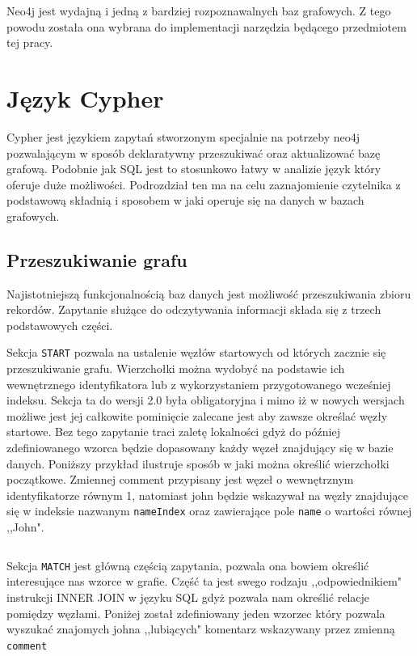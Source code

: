 \documentclass[brudnopis]{xmgr}
\begin{document}
Neo4j jest wydajną i jedną z bardziej rozpoznawalnych baz grafowych. Z tego powodu została ona wybrana do implementacji narzędzia będącego przedmiotem tej pracy.

\section{Język Cypher}
Cypher jest językiem zapytań stworzonym specjalnie na potrzeby neo4j pozwalającym w sposób deklaratywny przeszukiwać oraz aktualizować bazę grafową. Podobnie jak SQL jest to stosunkowo łatwy w analizie język który oferuje duże możliwości. Podrozdział ten ma na celu zaznajomienie czytelnika z podstawową składnią i sposobem w jaki operuje się na danych w bazach grafowych.

\subsection{Przeszukiwanie grafu}

Najistotniejszą funkcjonalnością baz danych jest możliwość przeszukiwania zbioru rekordów. Zapytanie służące do odczytywania informacji składa się z trzech podstawowych części.

Sekcja \texttt{START} pozwala na ustalenie węzłów startowych od których zacznie się przeszukiwanie grafu. Wierzchołki można wydobyć na podstawie ich wewnętrznego identyfikatora lub z wykorzystaniem przygotowanego wcześniej indeksu. Sekcja ta do wersji 2.0 była obligatoryjna i mimo iż w nowych wersjach możliwe jest jej całkowite pominięcie zalecane jest aby zawsze określać węzły startowe. Bez tego zapytanie traci zaletę lokalności gdyż do później zdefiniowanego wzorca będzie dopasowany każdy węzeł znajdujący się w bazie danych. Poniższy przykład ilustruje sposób w jaki można określić wierzchołki początkowe. Zmiennej comment przypisany jest węzeł o wewnętrznym identyfikatorze równym 1, natomiast john będzie wskazywał na węzły znajdujące się w indeksie nazwanym \texttt{nameIndex} oraz zawierające pole \texttt{name} o wartości równej ,,John".

\inputminted{cypher}{listings/cypher/start-section.cypher}

Sekcja \texttt{MATCH} jest główną częścią zapytania, pozwala ona bowiem określić interesujące nas wzorce w grafie. Część ta jest swego rodzaju ,,odpowiednikiem" instrukcji INNER JOIN w języku SQL gdyż pozwala nam określić relacje pomiędzy węzłami. Poniżej został zdefiniowany jeden wzorzec który pozwala wyszukać znajomych johna ,,lubiących" komentarz wskazywany przez zmienną \texttt{comment}
\end{document}
